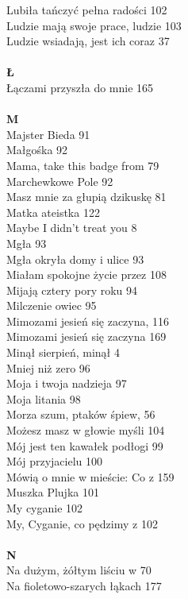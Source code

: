 \documentclass[a5paper, 10pt]{book}
\begin{document}
{\begin{multicols}{3}
    Lubiła tańczyć pełna radości 102\\
    Ludzie mają swoje prace, ludzie 103\\
    Ludzie wsiadają, jest ich coraz 37\\
    \\
    {\footnotesize \textbf{Ł\\} }
    Łączami przyszła do mnie 165\\
    \\
    {\footnotesize \textbf{M\\} }
    Majster Bieda 91\\
    Małgośka 92\\
    Mama, take this badge from 79\\
    Marchewkowe Pole 92\\
    Masz mnie za głupią dzikuskę 81\\
    Matka ateistka 122\\
    Maybe I didn't treat you 8\\
    Mgła 93\\
    Mgła okryła domy i ulice 93\\
    Miałam spokojne życie przez 108\\
    Mijają cztery pory roku 94\\
    Milczenie owiec 95\\
    Mimozami jesień się zaczyna, 116\\
    Mimozami jesień się zaczyna 169\\
    Minął sierpień, minął 4\\
    Mniej niż zero 96\\
    Moja i twoja nadzieja 97\\
    Moja litania 98\\
    Morza szum, ptaków śpiew, 56\\
    Możesz masz w głowie myśli 104\\
    Mój jest ten kawałek podłogi 99\\
    Mój przyjacielu 100\\
    Mówią o mnie w mieście: Co z 159\\
    Muszka Plujka 101\\
    My cyganie 102\\
    My, Cyganie, co pędzimy z 102\\
    \\
    {\footnotesize \textbf{N\\} }
    Na dużym, żółtym liściu w 70\\
    Na fioletowo-szarych łąkach 177\\

\end{multicols}}
\end{document}

